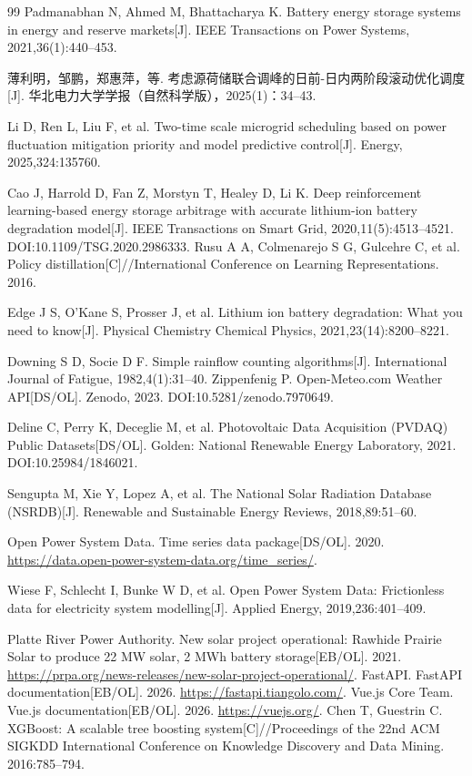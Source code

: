 \documentclass[12pt,a4paper]{ctexbook}
\begin{document}
\begin{thebibliography}{99}
Padmanabhan N, Ahmed M, Bhattacharya K. Battery energy storage systems in energy and reserve markets[J]. IEEE Transactions on Power Systems, 2021,36(1):440--453.

薄利明，邹鹏，郑惠萍，等. 考虑源荷储联合调峰的日前-日内两阶段滚动优化调度[J]. 华北电力大学学报（自然科学版），2025(1)：34--43.

Li D, Ren L, Liu F, et al. Two-time scale microgrid scheduling based on power fluctuation mitigation priority and model predictive control[J]. Energy, 2025,324:135760.

Cao J, Harrold D, Fan Z, Morstyn T, Healey D, Li K. Deep reinforcement learning-based energy storage arbitrage with accurate lithium-ion battery degradation model[J]. IEEE Transactions on Smart Grid, 2020,11(5):4513--4521. DOI:10.1109/TSG.2020.2986333.
Rusu A A, Colmenarejo S G, Gulcehre C, et al. Policy distillation[C]//International Conference on Learning Representations. 2016.

Edge J S, O'Kane S, Prosser J, et al. Lithium ion battery degradation: What you need to know[J]. Physical Chemistry Chemical Physics, 2021,23(14):8200--8221.

Downing S D, Socie D F. Simple rainflow counting algorithms[J]. International Journal of Fatigue, 1982,4(1):31--40.
Zippenfenig P. Open-Meteo.com Weather API[DS/OL]. Zenodo, 2023. DOI:10.5281/zenodo.7970649.

Deline C, Perry K, Deceglie M, et al. Photovoltaic Data Acquisition (PVDAQ) Public Datasets[DS/OL]. Golden: National Renewable Energy Laboratory, 2021. DOI:10.25984/1846021.

Sengupta M, Xie Y, Lopez A, et al. The National Solar Radiation Database (NSRDB)[J]. Renewable and Sustainable Energy Reviews, 2018,89:51--60.

Open Power System Data. Time series data package[DS/OL]. 2020. \url{https://data.open-power-system-data.org/time_series/}.

Wiese F, Schlecht I, Bunke W D, et al. Open Power System Data: Frictionless data for electricity system modelling[J]. Applied Energy, 2019,236:401--409.

Platte River Power Authority. New solar project operational: Rawhide Prairie Solar to produce 22 MW solar, 2 MWh battery storage[EB/OL]. 2021. \url{https://prpa.org/news-releases/new-solar-project-operational/}.
FastAPI. FastAPI documentation[EB/OL]. 2026. \url{https://fastapi.tiangolo.com/}.
Vue.js Core Team. Vue.js documentation[EB/OL]. 2026. \url{https://vuejs.org/}.
Chen T, Guestrin C. XGBoost: A scalable tree boosting system[C]//Proceedings of the 22nd ACM SIGKDD International Conference on Knowledge Discovery and Data Mining. 2016:785--794.


\end{thebibliography}
\end{document}
